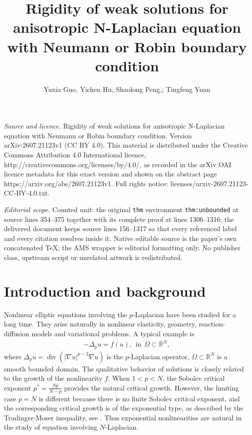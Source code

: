 \documentclass[10pt,a4paper]{amsart}
\numberwithin{equation}{section}
\newcommand{\R}{\mathbb{R}}
\begin{document}
\title[Rigidity of weak solutions for anisotropic N-Laplacian equat]{Rigidity of weak solutions for anisotropic N-Laplacian equation with Neumann or Robin boundary condition}
\author{Yuxia Guo, Yichen Hu, Shaolong Peng,; Tingfeng Yuan}
\date{}
\maketitle
\noindent\emph{Source and licence.} Rigidity of weak solutions for anisotropic N-Laplacian equation with Neumann or Robin boundary condition. Version arXiv:2607.21123v1 (CC BY 4.0). This material is distributed under the Creative Commons Attribution 4.0 International licence, http://creativecommons.org/licenses/by/4.0/, as recorded in the arXiv OAI licence metadata for this exact version and shown on the abstract page https://arxiv.org/abs/2607.21123v1. Full rights notice: licenses/arxiv-2607.21123-CC-BY-4.0.txt.\par\smallskip
\noindent\textit{Editorial scope.} Counted unit: the original \texttt{thm} environment \texttt{thm:unbounded} at source lines 354--375 together with its complete proof at lines 1306--1316; the delivered document keeps source lines 156--1317 so that every referenced label and every citation resolves inside it. Native editable source is the paper's own concatenated TeX; the AMS wrapper is editorial formatting only. No publisher class, upstream script or unrelated artwork is redistributed.
\section{Introduction and background}

Nonlinear elliptic equations involving the $p$-Laplacian have been studied for a long time. They arise naturally in nonlinear elasticity, geometry, reaction-diffusion models and variational problems. A typical example is
\begin{align}\label{p-Laplaican}
    -\Delta_p u=f(u), \ \ \text{in} \ \ \Omega \subset \R^N,
\end{align}
where $\Delta_p u=\operatorname{div}(|\nabla u|^{p-2}\nabla u)$ is the $p$-Laplacian operator, $\Omega\subset \R^N$ is a smooth bounded domain. The qualitative behavior of solutions is closely related to the growth of the nonlinearity $f$. When $1<p<N$, the Sobolev critical exponent $p^*=\frac{Np}{N-p}$ provides the natural critical growth. However, the limiting case $p=N$ is different because there is no finite Sobolev critical exponent, and the corresponding critical growth is of the exponential type, as described by the Trudinger-Moser inequality, see \cite{S1071, T1967}. Thus exponential nonlinearities are natural in the study of equation involving $N$-Laplacian.
\end{document}
